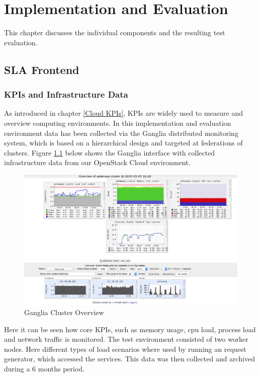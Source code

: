
\chapter{Implementation and Evaluation} %
\label{Evaluation} %
This chapter discusses the individual components and the resulting test evaluation.

\section{SLA Frontend}

\subsection{KPIs and Infrastructure Data}
As introduced in chapter \ref{Cloud KPIs}, KPIs are widely used to measure and overview computing environments. In this implementation and evaluation environment data has been collected via the Ganglia \cite{Ganglia} distributed monitoring system, which is based on a hierarchical design and targeted at federations of clusters. Figure \ref{fig:monidata} below shows the Ganglia interface with collected infrastructure data from our OpenStack Cloud environment.

\begin{figure}[ht]
	\centering
	\includegraphics[width=0.7\linewidth]{chapters/chapter5/fig/monidata_cluster}
	\caption{Ganglia Cluster Overview}
	\label{fig:monidata}
\end{figure}

Here it can be seen how core KPIs, such as memory usage, cpu load, process load and network traffic is monitored. The test environment consisted of two worker nodes. Here different types of load scenarios where used by running an request generator, which accessed the services. This data was then collected and archived during a 6 months period.

